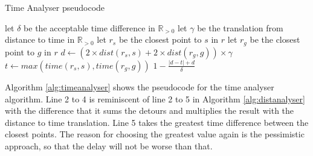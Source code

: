 \begin{algorithm}
	\caption{Time Analyser pseudocode}
	\label{alg:timeanalyser}
	\begin{algorithmic}[1]
		\Require 
		\Statex let $\delta$ be the acceptable time difference in $\mathbb{R}_{>0}$
		\Statex let $\gamma$ be the translation from distance to time in $\mathbb{R}_{>0}$ 
		\Statex 
			\State let $r_s$ be the closest point to $s$ in $r$
			\State let $r_g$ be the closest point to $g$ in $r$
			\State $d \gets (2\times dist(r_s,s) + 2\times dist(r_g,g))\times\gamma$
			\State $t \gets max(time(r_s, s), time(r_g, g))$
			\State\Return $1-\frac{|d - t| + d}{\delta}$
		\EndFunction
	\end{algorithmic}
\end{algorithm}

Algorithm \ref{alg:timeanalyser} shows the pseudocode for the time analyser algorithm.
Line 2 to 4 is reminiscent of line 2 to 5 in Algorithm \ref{alg:distanalyser} with the difference that it sums the detours and multiplies the result with the distance to time translation.
Line 5 takes the greatest time difference between the closest points.
The reason for choosing the greatest value again is the pessimistic approach, so that the delay will not be worse than that.




